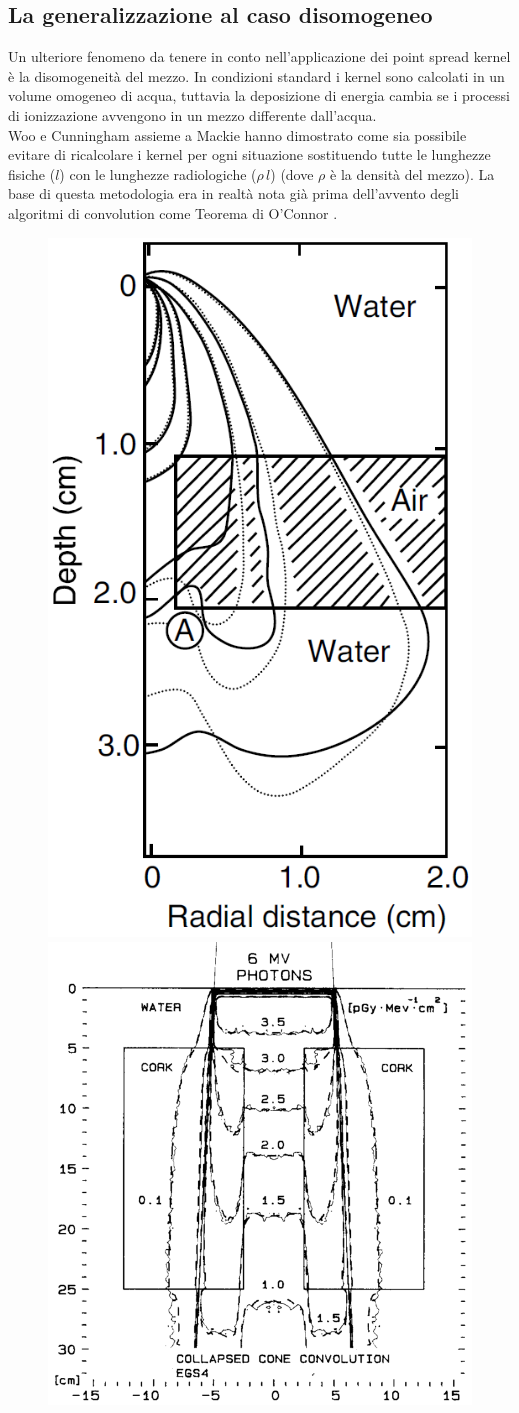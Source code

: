 {\subsection{La generalizzazione al caso disomogeneo}
Un ulteriore fenomeno da tenere in conto nell'applicazione dei point spread kernel è la disomogeneità del mezzo. In condizioni standard i kernel sono calcolati in un volume omogeneo di acqua, tuttavia la deposizione di energia cambia se i processi di ionizzazione avvengono in un mezzo differente dall'acqua.\\
Woo e Cunningham \cite{Woo1990} assieme a Mackie \cite{Mackie1985} hanno dimostrato come sia possibile evitare di ricalcolare i kernel per ogni situazione sostituendo tutte le lunghezze fisiche ($l$) con le lunghezze radiologiche ($\rho\,l$) (dove $\rho$ è la densità del mezzo). La base di questa metodologia era in realtà nota già prima dell'avvento degli algoritmi di convolution come Teorema di O'Connor \cite{OConnor1957}.\\
\begin{figure}[!t]
\centering
\includegraphics[width=.4\textwidth]{./cap1/kern_dens.png}
\includegraphics[width=.59\textwidth]{./cap1/kern_dens2.png}

\end{figure}}
